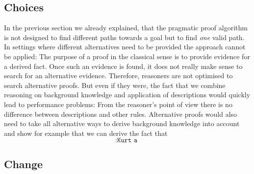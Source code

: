 \subsection{Choices}
In the previous section we already explained, that the pragmatic proof algorithm is not designed to find different paths towards a goal but to find \emph{one} valid path.
In settings where different alternatives need to be provided the approach cannot be applied: 
The purpose of a proof in the classical sense is to provide evidence for a derived fact. 
Once such an evidence is found, 
it does not really make sense to search for an alternative 
evidence. Therefore, \nthree reasoners are not optimised to search alternative proofs. But even if they were,
the fact that we
combine reasoning on background knowledge and application 
of \restdesc descriptions would quickly lead to performance problems:
From the reasoner's point of view there is no difference between \restdesc descriptions and other rules. Alternative proofs would also need to take all alternative 
ways to derive background knowledge into account and show for example that we can derive the fact that 
\[
 \texttt{:Kurt a }
\]



\subsection{Change}